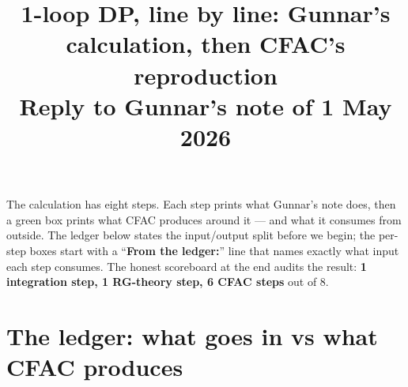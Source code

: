 \documentclass[11pt,a4paper]{article}
\title{\large 1-loop DP, line by line: Gunnar's calculation, then CFAC's reproduction\\[2pt]
\normalsize Reply to Gunnar's note of 1 May 2026}
\author{}
\date{}
\begin{document}
\maketitle
\vspace{-2em}

\noindent
The calculation has eight steps. Each step prints what Gunnar's note does, then a
green box prints what CFAC produces around it --- and what it consumes from outside.
The ledger below states the input/output split before we begin; the per-step boxes start
with a ``\textbf{From the ledger:}'' line that names exactly what input each step
consumes. The honest scoreboard at the end audits the result: \textbf{1 integration step,
1 RG-theory step, 6 CFAC steps} out of 8.

\section*{The ledger: what goes in vs what CFAC produces}
\end{document}
